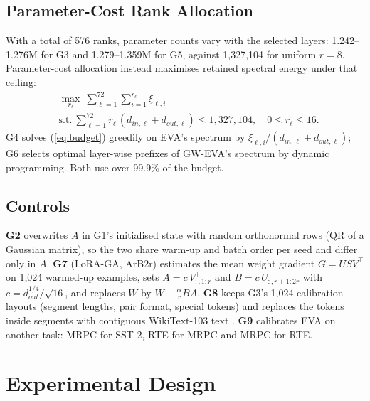 \documentclass[letterpaper]{article} %
\begin{document}
\subsection{Parameter-Cost Rank Allocation}
\label{sec:cost}
With a total of 576 ranks, parameter counts vary with the selected layers: 1.242--1.276M for G3 and 1.279--1.359M for G5, against 1,327,104 for uniform $r=8$. Parameter-cost allocation instead maximises retained spectral energy under that ceiling:
\begin{align}
&\max_{r_\ell}\ \sum_{\ell=1}^{72}\sum_{i=1}^{r_\ell}\xi_{\ell,i}\nonumber\\
&\text{s.t.}\ \sum_{\ell=1}^{72} r_\ell\,(d_{in,\ell}+d_{out,\ell})\le 1{,}327{,}104,\quad 0\le r_\ell\le 16 .
\label{eq:budget}
\end{align}
G4 solves (\ref{eq:budget}) greedily on EVA's spectrum by $\xi_{\ell,i}/(d_{in,\ell}+d_{out,\ell})$; G6 selects optimal layer-wise prefixes of GW-EVA's spectrum by dynamic programming. Both use over 99.9\% of the budget.

\subsection{Controls}
\label{sec:controls}
\textbf{G2} overwrites $A$ in G1's initialised state with random orthonormal rows (QR of a Gaussian matrix), so the two share warm-up and batch order per seed and differ only in $A$. \textbf{G7} (LoRA-GA, ArB2r) estimates the mean weight gradient $G=USV^\top$ on 1,024 warmed-up examples, sets $A=c\,V_{:,1:r}^\top$ and $B=c\,U_{:,r+1:2r}$ with $c=d_{out}^{1/4}/\sqrt{16}$, and replaces $W$ by $W-\frac{\alpha}{r}BA$. \textbf{G8} keeps G3's 1,024 calibration layouts (segment lengths, pair format, special tokens) and replaces the tokens inside segments with contiguous WikiText-103 text \citep{merity2017pointer}. \textbf{G9} calibrates EVA on another task: MRPC for SST-2, RTE for MRPC and MRPC for RTE.

\section{Experimental Design}
\end{document}
